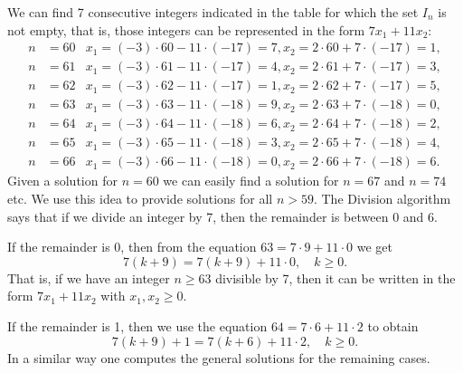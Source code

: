 We can find 7 consecutive integers indicated in the table for which the set $I_n$ is not empty,
that is, those integers can be represented in the form $7x_1+11x_2:$
\begin{align*}
n&=60 & x_1=(-3)\cdot 60-11\cdot(-17)=7, x_2=2\cdot 60+7\cdot(-17)=1,\\
n&=61 & x_1=(-3)\cdot 61-11\cdot(-17)=4, x_2=2\cdot 61+7\cdot(-17)=3,\\
n&=62 & x_1=(-3)\cdot 62-11\cdot(-17)=1, x_2=2\cdot 62+7\cdot(-17)=5,\\
n&=63 & x_1=(-3)\cdot 63-11\cdot(-18)=9, x_2=2\cdot 63+7\cdot(-18)=0,\\
n&=64 & x_1=(-3)\cdot 64-11\cdot(-18)=6, x_2=2\cdot 64+7\cdot(-18)=2,\\
n&=65 & x_1=(-3)\cdot 65-11\cdot(-18)=3, x_2=2\cdot 65+7\cdot(-18)=4,\\
n&=66 & x_1=(-3)\cdot 66-11\cdot(-18)=0, x_2=2\cdot 66+7\cdot(-18)=6.
\end{align*}
Given a solution for $n=60$ we can easily find a solution for $n=67$ and $n=74$ etc. We use this idea to
provide solutions for all $n>59$. The Division algorithm says that if we divide an integer by 7, then the 
remainder is between 0 and 6. 

If the remainder is 0, then from the equation $63=7\cdot 9+11\cdot 0$ we get
$$
7(k+9)=7(k+9)+11\cdot 0,\quad k\geq 0.
$$
That is, if we have an integer $n\geq 63$ divisible by 7, then it can be written in the form $7x_1+11x_2$ with $x_1,x_2\geq 0$.

If the remainder is 1, then we use the equation $64=7\cdot 6+11\cdot 2$ to obtain
$$
7(k+9)+1=7(k+6)+11\cdot 2,\quad k\geq 0.
$$
In a similar way one computes the general solutions for the remaining cases.

